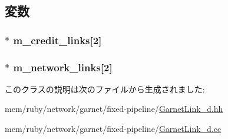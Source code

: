 \subsection{変数}
\hypertarget{classGarnetIntLink__d_a860e58e5ab24bd1c98b1af5d9054ee8c}{
\subsubsection[{m\_\-credit\_\-links}]{$\ast$ {\bf m\_\-credit\_\-links}\mbox{[}2\mbox{]}}}
\label{classGarnetIntLink__d_a860e58e5ab24bd1c98b1af5d9054ee8c}
\hypertarget{classGarnetIntLink__d_ab17adecfd76f3cd9cdd715b6e49dc199}{
\subsubsection[{m\_\-network\_\-links}]{$\ast$ {\bf m\_\-network\_\-links}\mbox{[}2\mbox{]}}}
\label{classGarnetIntLink__d_ab17adecfd76f3cd9cdd715b6e49dc199}


このクラスの説明は次のファイルから生成されました:\begin{DoxyCompactItemize}
\item 
mem/ruby/network/garnet/fixed-\/pipeline/\hyperlink{GarnetLink__d_8hh}{GarnetLink\_\-d.hh}\item 
mem/ruby/network/garnet/fixed-\/pipeline/\hyperlink{GarnetLink__d_8cc}{GarnetLink\_\-d.cc}\end{DoxyCompactItemize}
